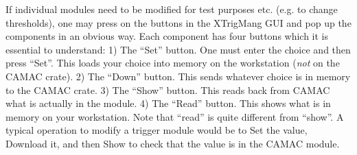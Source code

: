 \par
If individual modules need to be modified
for test purposes etc. (e.g. to change thresholds),
one may press on the buttons in the XTrigMang
GUI and pop up the components in an obvious way.
Each component has four buttons which it is
essential to understand: 
\hskip 0.05in
1) The ``Set'' button.  One must enter the choice
and then press ``Set''.  This loads your choice
into memory on the workstation ({\it not} on 
the CAMAC crate).
\hskip 0.05in
2) The ``Down'' button.  This sends whatever choice
is in memory to the CAMAC crate.
\hskip 0.05in
3) The ``Show'' button.  This reads back from CAMAC
what is actually in the module.
\hskip 0.05in
4) The ``Read'' button.  This shows what is in
memory on your workstation.  Note that ``read'' is quite 
different from ``show''.
A typical operation to modify a trigger module
would be to Set the value,
Download it, and then Show to check that the value
is in the CAMAC module.  

%
%
%

